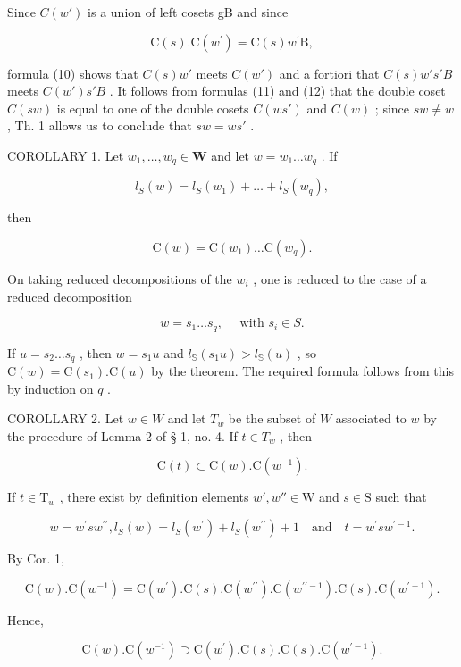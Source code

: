 Since \(C(w')\) is a union of left cosets gB and since

\[
\mathrm{C} (s). \mathrm{C} (w ^ {\prime}) = \mathrm{C} (s) w ^ {\prime} \mathrm{B},
\]

formula (10) shows that \(C(s)w'\) meets \(C(w')\) and a fortiori that \(C(s)w's'B\) meets \(C(w')s'B\) . It follows from formulas (11) and (12) that the double coset \(C(sw)\) is equal to one of the double cosets \(C(ws')\) and \(C(w)\) ; since \(sw \neq w\) , Th. 1 allows us to conclude that \(sw = ws'\) .

COROLLARY 1. Let \(w_{1}, \ldots, w_{q} \in \mathbf{W}\) and let \(w = w_{1} \ldots w_{q}\) . If

\[
l _ {S} (w) = l _ {S} \left(w _ {1}\right) + \dots + l _ {S} \left(w _ {q}\right),
\]

then

\[
\mathrm{C} (w) = \mathrm{C} (w _ {1}) \dots \mathrm{C} (w _ {q}).
\]

On taking reduced decompositions of the \(w_{i}\) , one is reduced to the case of a reduced decomposition

\[
w = s _ {1} \dots s _ {q}, \quad \text { with } s _ {i} \in S.
\]

If \(u = s_2 \ldots s_q\) , then \(w = s_1u\) and \(l_{\mathbb{S}}(s_1u) > l_{\mathbb{S}}(u)\) , so \(\mathrm{C}(w) = \mathrm{C}(s_1). \mathrm{C}(u)\) by the theorem. The required formula follows from this by induction on \(q\) .

COROLLARY 2. Let \(w \in W\) and let \(T_w\) be the subset of \(W\) associated to \(w\) by the procedure of Lemma 2 of § 1, no. 4. If \(t \in T_w\) , then

\[
\mathrm{C} (t) \subset \mathrm{C} (w). \mathrm{C} (w ^ {- 1}).
\]

If \(t \in \mathrm{T}_w\) , there exist by definition elements \(w', w'' \in \mathrm{W}\) and \(s \in \mathrm{S}\) such that

\[
w = w ^ {\prime} s w ^ {\prime \prime}, l _ {S} (w) = l _ {S} (w ^ {\prime}) + l _ {S} (w ^ {\prime \prime}) + 1 \quad \text {and} \quad t = w ^ {\prime} s w ^ {\prime - 1}.
\]

By Cor. 1,

\[
\mathrm{C} (w). \mathrm{C} (w ^ {- 1}) = \mathrm{C} (w ^ {\prime}). \mathrm{C} (s). \mathrm{C} (w ^ {\prime \prime}). \mathrm{C} (w ^ {\prime \prime - 1}). \mathrm{C} (s). \mathrm{C} (w ^ {\prime - 1}).
\]

Hence,

\[
\mathrm{C} (w). \mathrm{C} (w ^ {- 1}) \supset \mathrm{C} (w ^ {\prime}). \mathrm{C} (s). \mathrm{C} (s). \mathrm{C} (w ^ {\prime - 1}).
\]

